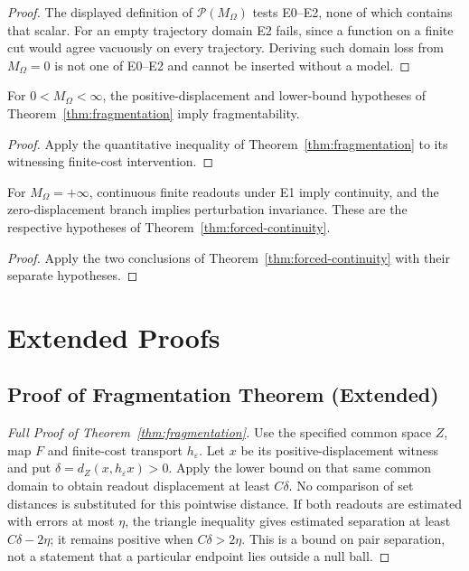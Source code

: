 \begin{proof}
The displayed definition of $\mathcal P(M_\Omega)$ tests E0--E2, none of which contains that scalar. For an empty trajectory domain E2 fails, since a function on a finite cut would agree vacuously on every trajectory. Deriving such domain loss from $M_\Omega=0$ is not one of E0--E2 and cannot be inserted without a model.
\end{proof}

\begin{proposition}
For $0<M_\Omega<\infty$, the positive-displacement and lower-bound hypotheses of Theorem~\ref{thm:fragmentation} imply fragmentability.
\end{proposition}

\begin{proof}
Apply the quantitative inequality of Theorem~\ref{thm:fragmentation} to its witnessing finite-cost intervention.
\end{proof}

\begin{proposition}
For $M_\Omega=+\infty$, continuous finite readouts under E1 imply continuity, and the zero-displacement branch implies perturbation invariance. These are the respective hypotheses of Theorem~\ref{thm:forced-continuity}.
\end{proposition}

\begin{proof}
Apply the two conclusions of Theorem~\ref{thm:forced-continuity} with their separate hypotheses.
\end{proof}

\section{Extended Proofs}

\subsection{Proof of Fragmentation Theorem (Extended)}

\begin{proof}[Full Proof of Theorem~\ref{thm:fragmentation}]
Use the specified common space $Z$, map $F$ and finite-cost transport $h_\varepsilon$. Let $x$ be its positive-displacement witness and put $\delta=d_Z(x,h_\varepsilon x)>0$. Apply the lower bound on that same common domain to obtain readout displacement at least $C\delta$. No comparison of set distances is substituted for this pointwise distance. If both readouts are estimated with errors at most $\eta$, the triangle inequality gives estimated separation at least $C\delta-2\eta$; it remains positive when $C\delta>2\eta$. This is a bound on pair separation, not a statement that a particular endpoint lies outside a null ball.
\end{proof}

